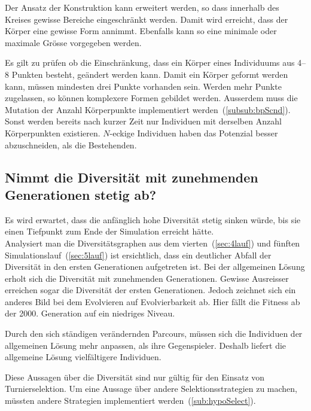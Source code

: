       \medskip

      Der Ansatz der Konstruktion kann erweitert werden,
      so dass innerhalb des Kreises gewisse Bereiche eingeschränkt werden.
      Damit wird erreicht, dass der Körper eine gewisse Form annimmt.
      Ebenfalls kann so eine minimale oder maximale Grösse vorgegeben werden.

      \medskip

      Es gilt zu prüfen ob die Einschränkung, dass ein Körper eines Individuums aus 4--8 Punkten besteht,
      geändert werden kann.
      Damit ein Körper geformt werden kann, müssen mindesten drei Punkte vorhanden sein.
      Werden mehr Punkte zugelassen, so können komplexere Formen gebildet werden.
      Ausserdem muss die Mutation der Anzahl Körperpunkte implementiert werden~(\vref{subsub:bpScnd}).
      Sonst werden bereits nach kurzer Zeit nur Individuen mit derselben Anzahl Körperpunkten existieren.
      \(N\)-eckige Individuen haben das Potenzial besser abzuschneiden, als die Bestehenden.

    \subsection{Nimmt die Diversität mit zunehmenden Generationen stetig ab?}

      Es wird erwartet, dass die anfänglich hohe Diversität stetig sinken würde,
      bis sie einen Tiefpunkt zum Ende der Simulation erreicht hätte.
      \\
      Analysiert man die Diversitätsgraphen aus dem vierten~(\vref{sec:4lauf}) und
      fünften Simulationslauf~(\vref{sec:5lauf}) ist ersichtlich,
      dass ein deutlicher Abfall der Diversität in den ersten Generationen aufgetreten ist.
      Bei der allgemeinen Lösung erholt sich die Diversität mit zunehmenden Generationen.
      Gewisse Ausreisser erreichen sogar die Diversität der ersten Generationen.
      Jedoch zeichnet sich ein anderes Bild bei dem Evolvieren auf Evolvierbarkeit ab.
      Hier fällt die Fitness ab der 2000. Generation auf ein niedriges Niveau.

      \medskip

      Durch den sich ständigen verändernden Parcours,
      müssen sich die Individuen der allgemeinen Lösung mehr anpassen, als ihre Gegenspieler.
      Deshalb liefert die allgemeine Lösung vielfältigere Individuen.

      \medskip

      Diese Aussagen über die Diversität sind nur gültig für den Einsatz von Turnierselektion.
      Um eine Aussage über andere Selektionsstrategien zu machen,
      müssten andere Strategien implementiert werden~(\vref{sub:hypoSelect}).

